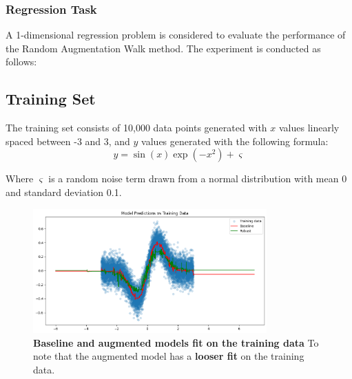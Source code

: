 \subsubsection{\textbf{Regression Task}}

A 1-dimensional regression problem is considered to evaluate the performance of the Random Augmentation Walk method. The experiment is conducted as follows:

\subsection{Training Set}
The training set consists of 10,000 data points generated with $x$ values linearly spaced between -3 and 3, and $y$ values generated with the following formula:
\begin{equation}
    y = \sin(x)\exp(-x^2) + \varsigma
\end{equation}

Where $\varsigma$ is a random noise term drawn from a normal distribution with mean 0 and standard deviation 0.1.

\begin{figure}[H]
    \centering
    \includegraphics[width=0.8\textwidth]{assets/fit_on_train.png} 
    \caption{\textbf{Baseline and augmented models fit on the training data} To note that the augmented model has a \textbf{looser fit} on the training data.}
    \label{fig:fit-train}
\end{figure}

